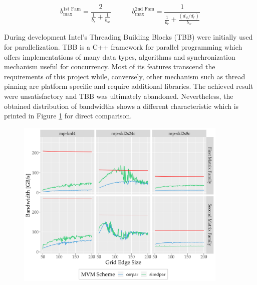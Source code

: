      $$
       b_{\text{max}}^{\text{1st Fam}} = \frac{2}{\frac{1}{b_r} + \frac{1}{b_w}} \quad \quad \quad
       b_{\text{max}}^{\text{2nd Fam}} = \frac{1}{\frac{1}{b_r} + \frac{(d_w/d_r)}{b_w}}
     $$
 
     During development Intel's Threading Building Blocks (TBB) \cite{tbb:github} were initially used for parallelization.
     TBB is a C++ framework for parallel programming which offers implementations of many data types, algorithms and
     synchronization mechanism useful for concurrency. Most of its features transcend the requirements of this project
     while, conversely, other mechanism such as thread pinning are platform specific and require additional libraries.
     The achieved result were unsatisfactory and TBB was ultimately abandoned. Nevertheless, the obtained distribution of
     bandwidths shows a different characteristic which is printed in Figure \ref{fig:mvm-perturbed-old} for direct
     comparison.
 
     \begin{figure}[H]
       \centering
       \captionsetup{width=0.9\textwidth}
       \includegraphics[width=0.9\textwidth]{assets/mvm-perturbed-old}
       \label{fig:mvm-perturbed-old}
     \end{figure}
 
